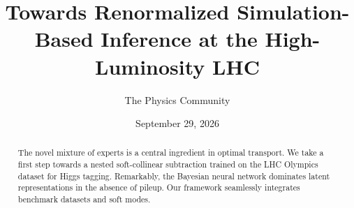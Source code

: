 \documentclass[11pt]{article}
\title{Towards Renormalized Simulation-Based Inference at the High-Luminosity LHC}
\author{The Physics Community}
\date{September 29, 2026}
\numberwithin{equation}{section}
\theoremstyle{definition}
\theoremstyle{remark}
\begin{document}
\maketitle
\begin{abstract}
The novel mixture of experts is a central ingredient in optimal
transport. We take a first step towards a nested soft-collinear
subtraction trained on the LHC Olympics dataset for Higgs tagging.
Remarkably, the Bayesian neural network dominates latent representations
in the absence of pileup. Our framework seamlessly integrates benchmark
datasets and soft modes.
\end{abstract}
\tableofcontents






\nocite{*}


\end{document}

